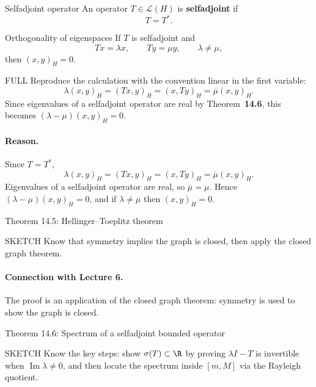 \documentclass[header={Lecture 11 Exam Study Notes}]{study-note}
\begin{document}
\begin{defbox}{Selfadjoint operator}
An operator $T\in\mathcal L(H)$ is \textbf{selfadjoint} if
\[
T=T^*.
\]
\end{defbox}

\begin{thmbox}{Orthogonality of eigenspaces}
If $T$ is selfadjoint and
\[
Tx=\lambda x,
\qquad
Ty=\mu y,
\qquad
\lambda\neq \mu,
\]
then $(x,y)_H=0$.
\end{thmbox}

\begin{prooflevelbox}{FULL}
Reproduce the calculation with the convention linear in the first variable:
\[
\lambda(x,y)_H=(Tx,y)_H=(x,Ty)_H=\overline{\mu}(x,y)_H.
\]
Since eigenvalues of a selfadjoint operator are real by Theorem~\textbf{14.6}, this becomes $(\lambda-\mu)(x,y)_H=0$.
\end{prooflevelbox}

\paragraph{Reason.}
Since $T=T^*$,
\[
\lambda(x,y)_H=(Tx,y)_H=(x,Ty)_H=\overline{\mu}(x,y)_H.
\]
Eigenvalues of a selfadjoint operator are real, so $\overline{\mu}=\mu$. Hence $(\lambda-\mu)(x,y)_H=0$, and if $\lambda\neq\mu$ then $(x,y)_H=0$.

\begin{thmbox}{Theorem 14.5: Hellinger--Toeplitz theorem}
\thmHellingerToeplitz
\end{thmbox}

\begin{prooflevelbox}{SKETCH}
Know that symmetry implies the graph is closed, then apply the closed graph theorem.
\end{prooflevelbox}

\paragraph{Connection with Lecture 6.}
The proof is an application of the closed graph theorem: symmetry is used to show the graph is closed.

\begin{thmbox}{Theorem 14.6: Spectrum of a selfadjoint bounded operator}
\thmSelfadjointSpectrumReal
\end{thmbox}

\begin{prooflevelbox}{SKETCH}
Know the key steps: show $\sigma(T)\subset\R$ by proving $\lambda I-T$ is invertible when $\operatorname{Im}\lambda\neq 0$, and then locate the spectrum inside $[m,M]$ via the Rayleigh quotient.
\end{prooflevelbox}
\end{document}
